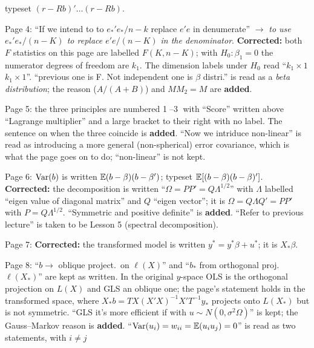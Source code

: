 \documentclass[11pt]{article}
\begin{document}
\begin{transcriptnotes}
        typeset $(r - Rb)'\ldots(r - Rb)$.
  \item Page 4: ``If we intend to to $e_{*}'e_{*}/n-k$ replace $e'e$ in
        denumerate'' $\to$ \emph{to use $e_{*}'e_{*}/(n-K)$ to replace $e'e/(n-K)$ in
        the denominator}. \textbf{Corrected:} both $F$ statistics on this page are
        labelled $F(K, n-K)$; with $H_{0}:\beta_{1} = 0$ the numerator degrees of
        freedom are $k_{1}$. The dimension labels under $H_{0}$ read
        ``$k_{1}\times1$  $k_{1}\times1$''. ``previous one is F. Not independent one
        is $\beta$ distri.'' is read as a \emph{beta distribution}; the reason
        ($A/(A+B)$) and $MM_{2} = M$ are \textbf{added}.
  \item Page 5: the three principles are numbered \textcircled{\scriptsize 1}--\textcircled{\scriptsize 3}
        with ``Score'' written above ``Lagrange multiplier'' and a large bracket to
        their right with no label. The sentence on when the three coincide is
        \textbf{added}. ``Now we intriduce non-linear'' is read as introducing a
        more general (non-spherical) error covariance, which is what the page goes
        on to do; ``non-linear'' is not kept.
  \item Page 6: $\operatorname{Var}(b)$ is written $\mathbb{E}(b - \beta)(b - \beta')$; typeset
        $\mathbb{E}[(b-\beta)(b-\beta)']$. \textbf{Corrected:} the decomposition is
        written ``$\Omega = PP' = Q\Lambda^{1/2}$'' with $\Lambda$ labelled ``eigen
        value of diagonal matrix'' and $Q$ ``eigen vector''; it is
        $\Omega = Q\Lambda Q' = PP'$ with $P = Q\Lambda^{1/2}$. ``Symmetric and
        positive definite'' is \textbf{added}. ``Refer to previous lecture'' is
        taken to be Lesson 5 (spectral decomposition).
  \item Page 7: \textbf{Corrected:} the transformed model is written
        $y^{*} = y^{*}\beta + u^{*}$; it is $X_{*}\beta$.
  \item Page 8: ``$b \to$ oblique project.\ on $\ell(X)$'' and ``$b_{*}$ from
        orthogonal proj.\ $\ell(X_{*})$'' are kept as written. In the original
        $y$-space OLS is the orthogonal projection on $L(X)$ and GLS an oblique one;
        the page's statement holds in the transformed space, where
        $X_{*}b = TX(X'X)^{-1}X'T^{-1}y_{*}$ projects onto $L(X_{*})$ but is not
        symmetric. ``GLS it's more efficient if with $u\sim N(0, \sigma^{2}\Omega)$''
        is kept; the Gauss--Markov reason is \textbf{added}. ``$\operatorname{Var}(u_{i}) =
        w_{ii} = \mathbb{E}(u_{i}u_{j}) = 0$'' is read as two statements, with $i \neq j$

\end{transcriptnotes}
\end{document}
